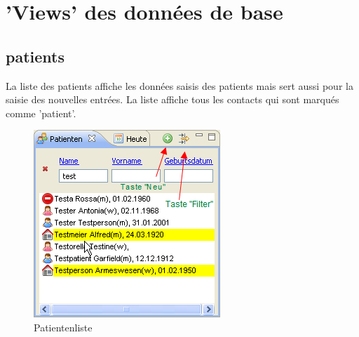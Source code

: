 
\section{'Views' des données de base}

\subsection{patients}
La liste des patients affiche les données saisis des patients mais sert aussi pour la saisie des nouvelles entrées. La liste affiche tous les contacts qui sont marqués comme 'patient'.
\begin{figure}[ht]
	\includegraphics{images/patlistview}
	\caption{Patientenliste}
	\label{fig:patlist}
\end{figure}

